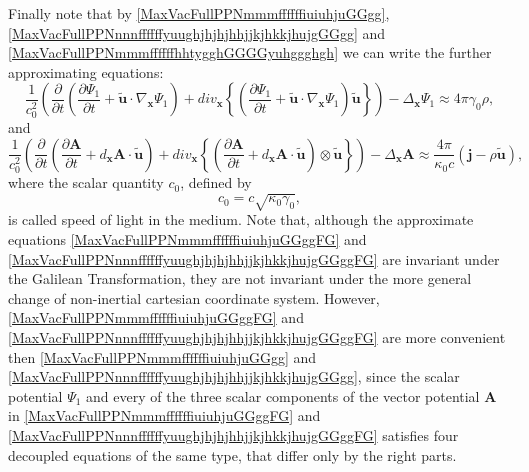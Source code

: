 \documentclass{article}
\theoremstyle{definition}
\theoremstyle{remark}
\renewcommand{\vec}[1]{\mathbf{#1}}
\newcommand{\er}{\eqref}
\newcommand{\er}{\eqref}
\begin{document}
Finally note that by \er{MaxVacFullPPNmmmffffffiuiuhjuGGgg},
\er{MaxVacFullPPNnnnffffffyuughjhjhjhhjjkjhkkjhujgGGgg} and
\er{MaxVacFullPPNmmmffffffhhtygghGGGGyuhggghgh} we can write the
further approximating equations:
\begin{equation}\label{MaxVacFullPPNmmmffffffiuiuhjuGGggFG}
\frac{1}{c^2_0}\left(\frac{\partial}{\partial
t}\left(\frac{\partial\Psi_1}{\partial t}+\vec {\tilde
u}\cdot\nabla_{\vec x}\Psi_1\right)+div_{\vec x}
\left\{\left(\frac{\partial\Psi_1}{\partial t}+\vec {\tilde
u}\cdot\nabla_{\vec x}\Psi_1\right)\vec {\tilde
u}\right\}\right)-\Delta_{\vec x}\Psi_1 \approx 4\pi\gamma_0\rho,
\end{equation}
and
\begin{equation}\label{MaxVacFullPPNnnnffffffyuughjhjhjhhjjkjhkkjhujgGGggFG}
\frac{1}{c^2_0}\left(\frac{\partial}{\partial
t}\left(\frac{\partial\vec A}{\partial t}+d_{\vec x}\vec A\cdot\vec
{\tilde u}\right)+div_{\vec x} \left\{\left(\frac{\partial\vec
A}{\partial t}+d_{\vec x}\vec A\cdot\vec {\tilde
u}\right)\otimes\vec {\tilde u}\right\}\right)-\Delta_{\vec x}\vec
A\approx \frac{4\pi}{\kappa_0 c}\left(\vec j-\rho\vec {\tilde
u}\right),
\end{equation}
where the scalar quantity $c_0$, defined by
\begin{equation}\label{gughhghfbvnbv}
c_0=c\sqrt{\kappa_0\gamma_0},
\end{equation}
is called speed of light in the medium. Note that, although the
approximate equations \er{MaxVacFullPPNmmmffffffiuiuhjuGGggFG} and
\er{MaxVacFullPPNnnnffffffyuughjhjhjhhjjkjhkkjhujgGGggFG} are
invariant under the Galilean Transformation, they are not invariant
under the more general change of non-inertial cartesian coordinate
system. However, \er{MaxVacFullPPNmmmffffffiuiuhjuGGggFG} and
\er{MaxVacFullPPNnnnffffffyuughjhjhjhhjjkjhkkjhujgGGggFG} are more
convenient then \er{MaxVacFullPPNmmmffffffiuiuhjuGGgg} and
\er{MaxVacFullPPNnnnffffffyuughjhjhjhhjjkjhkkjhujgGGgg}, since the
scalar potential $\Psi_1$ and every of the three scalar components
of the vector potential $\vec A$ in
\er{MaxVacFullPPNmmmffffffiuiuhjuGGggFG} and
\er{MaxVacFullPPNnnnffffffyuughjhjhjhhjjkjhkkjhujgGGggFG} satisfies
four decoupled equations of the same type, that differ only by the
right parts.
\end{document}

